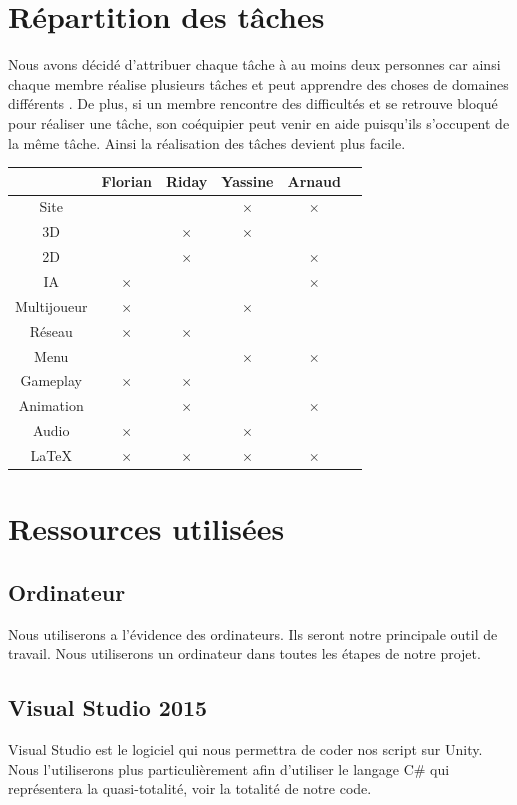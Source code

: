 \documentclass[a4paper, 12pt]{article}
\begin{document}
\section{Répartition des tâches}
Nous avons décidé d’attribuer chaque tâche à au moins deux personnes car ainsi chaque membre réalise plusieurs tâches et peut apprendre des choses de domaines différents . De plus, si un membre rencontre des difficultés et se retrouve bloqué pour réaliser une tâche, son coéquipier peut venir en aide puisqu’ils s’occupent de la même tâche. Ainsi la réalisation des tâches devient plus facile.
\bigbreak
\bigbreak
	\begin{tabular}{|c||c|c|c|c|c|}
		\hline
		& Florian & Riday & Yassine & Arnaud \\
		\hline
		Site & & & $\times$ & $\times$\\
		\hline
		3D & & $\times$ & $\times$ &\\
		\hline
		2D & & $\times$ & & $\times$\\
		\hline
		IA & $\times$ & & & $\times$\\
		\hline
		Multijoueur & $\times$ & & $\times$ &\\
		\hline
		Réseau & $\times$ & $\times$ & & \\
		\hline
		Menu & & & $\times$ & $\times$\\
		\hline
		Gameplay & $\times$ & $\times$ & &\\
		\hline
		Animation & & $\times$ & & $\times$\\		
		\hline
		Audio & $\times$ & & $\times$ &\\
		\hline
		\LaTeX & $\times$ & $\times$ & $\times$ & $\times$\\
		\hline
	\end{tabular}
	\newpage
\section{Ressources utilisées}
	\subsection{Ordinateur}
	Nous utiliserons a l'évidence des ordinateurs. Ils seront notre principale outil de travail. Nous utiliserons un ordinateur dans toutes les étapes de notre projet. 
	\subsection{Visual Studio 2015}
	Visual Studio est le logiciel qui nous permettra de coder nos script sur Unity. Nous l'utiliserons plus particulièrement afin d'utiliser le langage C\# qui représentera la quasi-totalité, voir la totalité de notre code.
\end{document}
